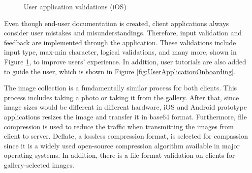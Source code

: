 \begin{figure}[htbp]
\centering
{}
\caption{User application validations (iOS)}
\label{fig:UserApplicationValidations}
\end{figure}

Even though end-user documentation is created, client applications always consider user mistakes and misunderstandings. Therefore, input validation and feedback are implemented through the application. These validations include input type, max-min character, logical validations, and many more, shown in Figure \ref{fig:UserApplicationValidations}, to improve users' experience. In addition, user tutorials are also added to guide the user, which is shown in Figure \ref{fig:UserApplicationOnboarding}.

The image collection is a fundamentally similar process for both clients. This process includes taking a photo or taking it from the gallery. After that, since image sizes would be different in different hardware, iOS and Android prototype applications resizes the image and transfer it in base64 format. Furthermore, file compression is used to reduce the traffic when transmitting the images from client to server. Deflate, a lossless compression format, is selected for compassion since it is a widely used open-source compression algorithm available in major operating systems. In addition, there is a file format validation on clients for gallery-selected images. 

